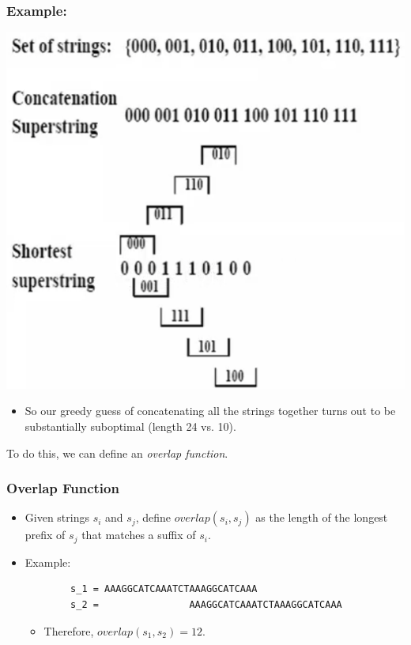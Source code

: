 \documentclass[10pt]{article}
\begin{document}
\subsubsection*{Example:}
\begin{center}
    \includegraphics*[scale=0.8]{W4_5.png}
\end{center}
\begin{itemize}
    \item So our greedy guess of concatenating all the strings together turns out to be substantially suboptimal (length 24 vs. 10).
\end{itemize}
To do this, we can define an \textit{overlap function}.

\subsubsection*{Overlap Function}
\begin{itemize}
    \item Given strings $s_i$ and $s_j$, define $overlap(s_i, s_j)$ as the length of the longest prefix of $s_j$ that matches a suffix of $s_i$.
    \item Example:
    \begin{verbatim}
        s_1 = AAAGGCATCAAATCTAAAGGCATCAAA
        s_2 =                AAAGGCATCAAATCTAAAGGCATCAAA
    \end{verbatim}
    \begin{itemize}
        \item Therefore, $overlap(s_1, s_2) = 12$.
    \end{itemize}
\end{itemize}
\end{document}
